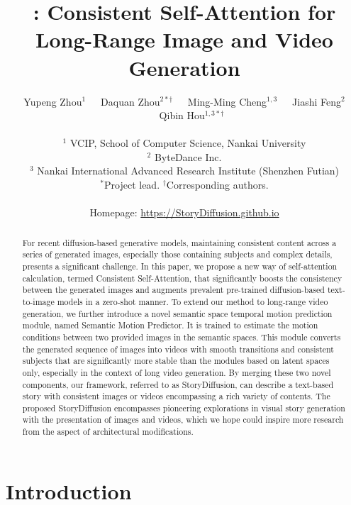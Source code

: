 \documentclass{article} %
\title{\nameofmethod{}: Consistent Self-Attention for Long-Range Image and Video Generation}
\author{Yupeng Zhou$^1$~~~Daquan Zhou$^{2*\dagger}$~~~Ming-Ming Cheng$^{1,3}$~~~Jiashi Feng$^2$~~~Qibin Hou$^{1,3*\dagger}$ \\ \\
$^1$ VCIP, School of Computer Science, Nankai University \\
$^2$ ByteDance Inc. \\
$^3$ Nankai International Advanced Research Institute (Shenzhen Futian) \\ 
{$^{*}$Project lead. $^{\dagger}$Corresponding authors.} \\ \\
{Homepage: \url{https://StoryDiffusion.github.io}}
}
\newcommand{\nameofmethod}{StoryDiffusion}
\newcommand{\nameofsa}{Consistent Self-Attention}
\newcommand{\nameofmm}{Semantic Motion Predictor}
\begin{document}
\maketitle

\begin{abstract}
For recent diffusion-based generative models, maintaining consistent content across a series of generated images, especially those containing subjects and complex details, presents a significant challenge.
In this paper, we propose a new way of self-attention calculation, termed \nameofsa{}, that significantly boosts the consistency between the generated images and augments prevalent pre-trained diffusion-based text-to-image models in a zero-shot manner.
%
To extend our method to long-range video generation, we  further introduce a novel semantic space temporal motion prediction module, named \nameofmm{}. It is trained to estimate the motion conditions between two provided images in the semantic spaces. 
%
This module converts the generated sequence of images into videos with smooth transitions and consistent subjects that are significantly more stable than the modules based on latent spaces only, especially in the context of long video generation. 
%
By merging these two novel components, our framework, referred to as \nameofmethod{}, can describe a text-based story with consistent images or videos encompassing a rich variety of contents.
%
The proposed \nameofmethod{} encompasses pioneering explorations in visual story generation with the presentation of images and videos, which we hope could inspire more research from the aspect of architectural modifications.
%
\end{abstract}

\section{Introduction}
\label{sec:intro}
\end{document}
